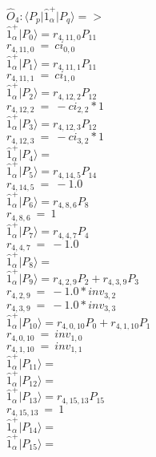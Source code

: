\documentclass[14pt]{article}
\begin{document}
    $\hat{O}_{4}:  \langle{P_p}\vert \hat{1}_{\alpha}^{+} \vert{P_q}\rangle => $ \\ 
    $ \hat{1}_{\alpha}^{+} \vert{P_{0}}\rangle = {r}_{4,11,0}P_{11} $ \\ 
    ${r}_{4,11,0}\ =\ {ci}_{0,0} $ \\ 
    $ \hat{1}_{\alpha}^{+} \vert{P_{1}}\rangle = {r}_{4,11,1}P_{11} $ \\ 
    ${r}_{4,11,1}\ =\ {ci}_{1,0} $ \\ 
    $ \hat{1}_{\alpha}^{+} \vert{P_{2}}\rangle = {r}_{4,12,2}P_{12} $ \\ 
    ${r}_{4,12,2}\ =\ -{ci}_{2,2}*1 $ \\ 
    $ \hat{1}_{\alpha}^{+} \vert{P_{3}}\rangle = {r}_{4,12,3}P_{12} $ \\ 
    ${r}_{4,12,3}\ =\ -{ci}_{3,2}*1 $ \\ 
    $ \hat{1}_{\alpha}^{+} \vert{P_{4}}\rangle =  $ \\ 
    $ \hat{1}_{\alpha}^{+} \vert{P_{5}}\rangle = {r}_{4,14,5}P_{14} $ \\ 
    ${r}_{4,14,5}\ =\ -1.0 $ \\ 
    $ \hat{1}_{\alpha}^{+} \vert{P_{6}}\rangle = {r}_{4,8,6}P_{8} $ \\ 
    ${r}_{4,8,6}\ =\ 1 $ \\ 
    $ \hat{1}_{\alpha}^{+} \vert{P_{7}}\rangle = {r}_{4,4,7}P_{4} $ \\ 
    ${r}_{4,4,7}\ =\ -1.0 $ \\ 
    $ \hat{1}_{\alpha}^{+} \vert{P_{8}}\rangle =  $ \\ 
    $ \hat{1}_{\alpha}^{+} \vert{P_{9}}\rangle = {r}_{4,2,9}P_{2}+{r}_{4,3,9}P_{3} $ \\ 
    ${r}_{4,2,9}\ =\ -1.0*{inv}_{3,2} $ \\ 
    ${r}_{4,3,9}\ =\ -1.0*{inv}_{3,3} $ \\ 
    $ \hat{1}_{\alpha}^{+} \vert{P_{10}}\rangle = {r}_{4,0,10}P_{0}+{r}_{4,1,10}P_{1} $ \\ 
    ${r}_{4,0,10}\ =\ {inv}_{1,0} $ \\ 
    ${r}_{4,1,10}\ =\ {inv}_{1,1} $ \\ 
    $ \hat{1}_{\alpha}^{+} \vert{P_{11}}\rangle =  $ \\ 
    $ \hat{1}_{\alpha}^{+} \vert{P_{12}}\rangle =  $ \\ 
    $ \hat{1}_{\alpha}^{+} \vert{P_{13}}\rangle = {r}_{4,15,13}P_{15} $ \\ 
    ${r}_{4,15,13}\ =\ 1 $ \\ 
    $ \hat{1}_{\alpha}^{+} \vert{P_{14}}\rangle =  $ \\ 
    $ \hat{1}_{\alpha}^{+} \vert{P_{15}}\rangle =  $ \\ 
    
\end{document}
